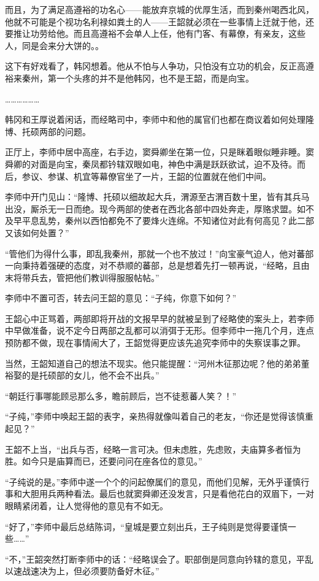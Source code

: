 而且，为了满足高遵裕的功名心——能放弃京城的优厚生活，而到秦州喝西北风，他就不可能是个视功名利禄如粪土的人——王韶就必须在一些事情上迁就于他，还要推让功劳给他。而且高遵裕不会单人上任，他有门客、有幕僚，有亲友，这些人，同是会来分大饼的。。

这下有好戏看了，韩冈想着。他从不怕与人争功，只怕没有立功的机会，反正高遵裕来秦州，第一个头疼的并不是他韩冈，也不是王韶，而是向宝。

………………

韩冈和王厚说着闲话，而经略司中，李师中和他的属官们也都在商议着如何处理隆博、托硕两部的问题。

正厅上，李师中居中高座，右手边，窦舜卿坐在第一位，只是眯着眼似睡非睡。窦舜卿的对面是向宝，秦凤都钤辖双眼如电，神色中满是跃跃欲试，迫不及待。而后，参议、参谋、机宜等幕僚官坐了一片，王韶的位置就在他们中间。

李师中开门见山：“隆博、托硕以细故起大兵，渭源至古渭百数十里，皆有其兵马出没，厮杀无一日而绝。现今两部的使者在西北各部中四处奔走，厚赂求盟。如不及早平息乱势，秦州以西怕都免不了要烽火连绵。不知诸位对此有何高见？此二部又该如何处置？”

“管他们为得什么事，即乱我秦州，那就一个也不放过！”向宝豪气迫人，他对蕃部一向秉持着强硬的态度，对不恭顺的蕃部，总是想着先打一顿再说，“经略，且由末将带兵去，管把他们教训得服服帖帖。”

李师中不置可否，转去问王韶的意见：“子纯，你意下如何？”

王韶心中正骂着，两部即将开战的文报早早的就被呈到了经略使的案头上，若李师中早做准备，说不定今日两部之乱都可以消弭于无形。但李师中一拖几个月，连点预防都不做，现在事情闹大了，王韶觉得更应该先追究李师中的失察误事之罪。

当然，王韶知道自己的想法不现实。他只能提醒：“河州木征那边呢？他的弟弟董裕娶的是托硕部的女儿，他不会不出兵。”

“朝廷行事哪能顾忌那么多，瞻前顾后，岂不徒惹蕃人笑？！”

“子纯，”李师中唤起王韶的表字，亲热得就像叫着自己的老友，“你还是觉得该慎重起见？”

王韶不上当，“出兵与否，经略一言可决。但未虑胜，先虑败，夫庙算多者恒为胜。如今只是庙算而已，还要问问在座各位的意见。”

“子纯说的是。”李师中遂一个个的问起僚属们的意见，而他们见解，无外乎谨慎行事和大胆用兵两种看法。最后也就窦舜卿还没发言，只是看他花白的双眉下，一对眼睛紧闭着，让人觉得他的意见有不如无。

“好了，”李师中最后总结陈词，“皇城是要立刻出兵，王子纯则是觉得要谨慎一些……”

“不，”王韶突然打断李师中的话：“经略误会了。职部倒是同意向钤辖的意见，平乱以速战速决为上，但必须要防备好木征。”

